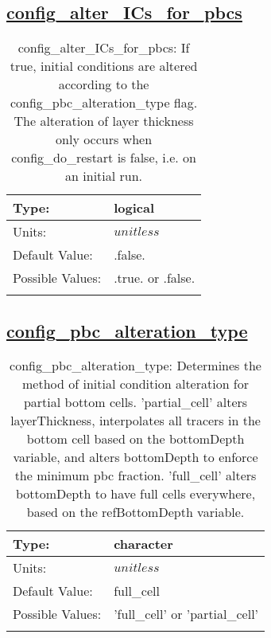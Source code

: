 \subsection[config\_alter\_ICs\_for\_pbcs]{\hyperref[sec:nm_tab_partial_bottom_cells]{config\_alter\_ICs\_for\_pbcs}}
\label{subsec:nm_sec_config_alter_ICs_for_pbcs}
\begin{center}
\begin{longtable}{| p{2.0in} | p{4.0in} |}
    \hline
    Type: & logical \\
    \hline
    Units: & $unitless$ \\
    \hline
    Default Value: & .false. \\
    \hline
    Possible Values: & .true. or .false. \\
    \hline
    \caption{config\_alter\_ICs\_for\_pbcs: If true, initial conditions are altered according to the config\_pbc\_alteration\_type flag.  The alteration of layer thickness only occurs when config\_do\_restart is false, i.e. on an initial run.}
\end{longtable}
\end{center}
\subsection[config\_pbc\_alteration\_type]{\hyperref[sec:nm_tab_partial_bottom_cells]{config\_pbc\_alteration\_type}}
\label{subsec:nm_sec_config_pbc_alteration_type}
\begin{center}
\begin{longtable}{| p{2.0in} | p{4.0in} |}
    \hline
    Type: & character \\
    \hline
    Units: & $unitless$ \\
    \hline
    Default Value: & full\_cell \\
    \hline
    Possible Values: & 'full\_cell' or 'partial\_cell' \\
    \hline
    \caption{config\_pbc\_alteration\_type: Determines the method of initial condition alteration for partial bottom cells.  'partial\_cell' alters layerThickness, interpolates all tracers in the bottom cell based on the bottomDepth variable, and alters bottomDepth to enforce the minimum pbc fraction.  'full\_cell' alters bottomDepth to have full cells everywhere, based on the refBottomDepth variable.}
\end{longtable}
\end{center}

